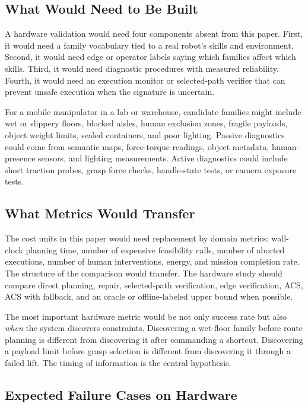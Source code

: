 \documentclass{article}
\newcommand{\ACS}{\textsc{ACS}}
\begin{document}
\subsection{What Would Need to Be Built}

A hardware validation would need four components absent from this paper. First, it would need a family vocabulary tied to a real robot's skills and environment. Second, it would need edge or operator labels saying which families affect which skills. Third, it would need diagnostic procedures with measured reliability. Fourth, it would need an execution monitor or selected-path verifier that can prevent unsafe execution when the signature is uncertain.

For a mobile manipulator in a lab or warehouse, candidate families might include wet or slippery floors, blocked aisles, human exclusion zones, fragile payloads, object weight limits, sealed containers, and poor lighting. Passive diagnostics could come from semantic maps, force-torque readings, object metadata, human-presence sensors, and lighting measurements. Active diagnostics could include short traction probes, grasp force checks, handle-state tests, or camera exposure tests.

\subsection{What Metrics Would Transfer}

The cost units in this paper would need replacement by domain metrics: wall-clock planning time, number of expensive feasibility calls, number of aborted executions, number of human interventions, energy, and mission completion rate. The structure of the comparison would transfer. The hardware study should compare direct planning, repair, selected-path verification, edge verification, \ACS{}, \ACS{} with fallback, and an oracle or offline-labeled upper bound when possible.

The most important hardware metric would be not only success rate but also \emph{when} the system discovers constraints. Discovering a wet-floor family before route planning is different from discovering it after commanding a shortcut. Discovering a payload limit before grasp selection is different from discovering it through a failed lift. The timing of information is the central hypothesis.

\subsection{Expected Failure Cases on Hardware}
\end{document}
